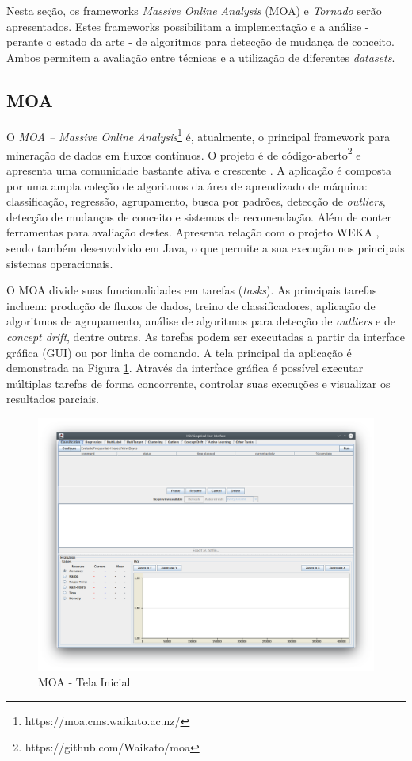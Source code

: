 \documentclass[qual, classic, a4paper]{ufbathesis}
\begin{document}
Nesta seção, os frameworks \textit{Massive Online Analysis} (MOA) e \textit{Tornado} serão apresentados.
Estes frameworks possibilitam a implementação e a análise - perante o estado da arte - de algoritmos para detecção de mudança de conceito.
Ambos permitem a avaliação entre técnicas e a utilização de diferentes \textit{datasets}.

\subsection{MOA}

O \textit{MOA – Massive Online Analysis}\footnote{https://moa.cms.waikato.ac.nz/} é, atualmente, o principal framework para mineração de dados em fluxos contínuos.
O projeto é de código-aberto\footnote{https://github.com/Waikato/moa} e apresenta uma comunidade bastante ativa e crescente \cite{Bifet:2010:MMO:1756006.1859903}.
A aplicação é composta por uma ampla coleção de algoritmos da área de aprendizado de máquina: classificação, regressão, agrupamento, busca por padrões, detecção de \textit{outliers}, detecção de mudanças de conceito e sistemas de recomendação.
Além de conter ferramentas para avaliação destes.
Apresenta relação com o projeto WEKA \cite{Hall:2009:WDM:1656274.1656278}, sendo também desenvolvido em Java, o que permite a sua execução nos principais sistemas operacionais.

O MOA divide suas funcionalidades em tarefas (\textit{tasks}).
As principais tarefas incluem:
produção de fluxos de dados,
treino de classificadores,
aplicação de algoritmos de agrupamento,
análise de algoritmos para detecção de \textit{outliers} e de \textit{concept drift}, dentre outras.
As tarefas podem ser executadas a partir da interface gráfica (GUI) ou por linha de comando.
A tela principal da aplicação é demonstrada na Figura \ref{fig:moa}.
Através da interface gráfica é possível executar múltiplas tarefas de forma concorrente, 
controlar suas execuções e visualizar os resultados parciais.

\begin{figure}[H]
\begin{center}
    \includegraphics[scale=0.5]{imagens/moa.png}
    \caption{MOA - Tela Inicial}
    \label{fig:moa}
\end{center}
\end{figure}
\end{document}
